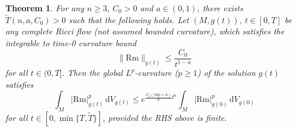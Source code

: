 \documentclass{amsart}
\newtheorem{thm}{Theorem}[section]
\theoremstyle{definition}
\newcommand{\Rm}{\mathrm{Rm}}
\newcommand{\dV}{\mathrm{d}V}
\begin{document}
    \begin{thm}\label{upperContLp}
        For any $n\geq 3$, $C_0>0$ and $a\in (0,1)$, there exists $\widetilde T(n,a,C_0)>0$ such that the following holds. Let $(M,g(t))$, $t\in [0,T]$ be any complete Ricci flow (not assumed bounded curvature), which satisfies the integrable to time-0 curvature bound
        \begin{equation}\label{integrableCurveBoundLemma}
        \|\Rm\|_{g(t)}\leq \frac{C_0}{t^{1-a}}
        \end{equation}
        for all $t\in (0,T]$. Then the global $L^p$-curvature ($p\geq 1$) of the solution $g(t)$ satisfies
        \[
        \int_M |\mathrm{Rm}|_{g(t)}^p\,\dV_{g(t)}\leq e^{\frac{C_0(16p+n)}{a}t^a}\int_M |\mathrm{Rm}|_{g(0)}^p\,\dV_{g(0)}
        \]
        for all $t\in [0,\min\{T,\widetilde T\}]$, provided the RHS above is finite.
    \end{thm}
\end{document}
